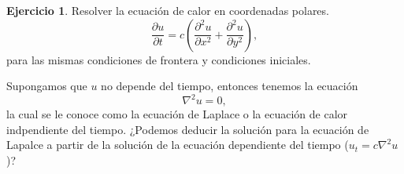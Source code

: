 \documentclass[11pt,letterpaper,draft]{report}
\theoremstyle{plain}
\theoremstyle{definition}
\newtheorem{exercise}[theorem]{Ejercicio}
\theoremstyle{remark}
\newcommand\<{\langle}
\renewcommand\>{\rangle}
\begin{document}
\begin{exercise}
  Resolver la ecuación de calor en coordenadas polares.
  \[
    \frac{\partial u}{\partial t} = c\left(\frac{\partial^2 u}{\partial x^2} + \frac{\partial^2u}{\partial y^2}\right),
  \] para las mismas condiciones de frontera y condiciones iniciales.

  Supongamos que $u$ no depende del tiempo, entonces tenemos la ecuación
  \[
  \nabla^2 u = 0,
\] la cual se le conoce como la ecuación de Laplace o la ecuación de calor indpendiente del tiempo. ¿Podemos deducir la solución para la ecuación de Lapalce a partir de la solución de la ecuación dependiente del tiempo ($u_t = c \nabla^2 u$)?
\end{exercise}
\end{document}

